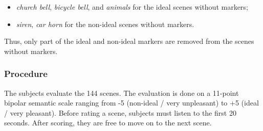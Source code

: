 \documentclass[12pt]{elsarticle}
\begin{document}


\begin{itemize}
\item \emph{church bell}, \emph{bicycle bell}, and \emph{animals} for the ideal scenes without markers;
\item \emph{siren}, \emph{car horn} for the non-ideal scenes without markers.
\end{itemize}


Thus, only part of the ideal and non-ideal markers are removed from the scenes without markers.

\subsubsection*{Procedure}


The subjects evaluate the 144 scenes. The evaluation is done on a 11-point bipolar semantic scale ranging from -5 (non-ideal / very unpleasant) to +5 (ideal / very pleasant). Before rating a scene, subjects must listen to the first 20 seconds. After scoring, they are free to move on to the next scene.

\end{document}
